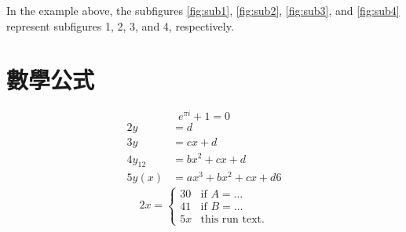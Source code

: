 \documentclass[
    writingLanguage=english, 
    addPageTitle=yes,
    AddDeclaration=yes,
    addMUSTlog=no,
    refUnindent=yes,
    printing=no,
]{.def/must}
\begin{document}
In the example above, the subfigures \ref{fig:sub1}, \ref{fig:sub2}, \ref{fig:sub3}, and \ref{fig:sub4} represent subfigures 1, 2, 3, and 4, respectively.


\chapter{數學公式}
\begin{equation}
\label{eq1}
e^{\pi i}+1=0
\end{equation}
\begin{align}
2 y & =d\label{eq:IntoSection}\\
3 y & =cx+d\\
4 y_{12} & =bx^{2}+cx+d\\
5 y(x) & =ax^{3}+bx^{2}+cx+d
6 
\end{align}
\begin{equation}
2 x=\left\{ \begin{array}{cl}
3 0 & \textrm{if }A=\ldots\\
4 1 & \textrm{if }B=\ldots\\
5 x & \textrm{this run  text.}\end
{array}\right.
\end{equation}       
\end{document}
